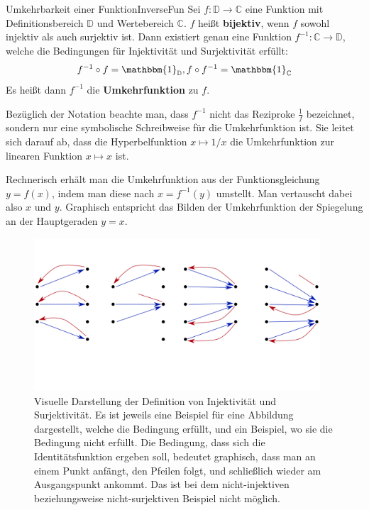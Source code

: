 \begin{statement}{Umkehrbarkeit einer Funktion}{InverseFun}
    Sei $f: \mathbb{D} \to \mathbb{C}$ eine Funktion mit Definitionsbereich $\mathbb{D}$ und Wertebereich $\mathbb{C}$. $f$ heißt \textbf{bijektiv}, wenn $f$ sowohl injektiv als auch surjektiv ist. Dann existiert genau eine Funktion $f^{-1}: \mathbb{C} \to \mathbb{D}$, welche die Bedingungen für Injektivität und Surjektivität erfüllt:
    $$
    f^{-1} \circ f = \mathbbm{1}_\mathbb{D}, f \circ f^{-1} = \mathbbm{1}_\mathbb{C}
    $$
    Es heißt dann $f^{-1}$ die \textbf{Umkehrfunktion} zu $f$.
\end{statement}

Bezüglich der Notation beachte man, dass $f^{-1}$ nicht das Reziproke $\frac{1}{f}$ bezeichnet, sondern nur eine symbolische Schreibweise für die Umkehrfunktion ist. Sie leitet sich darauf ab, dass die Hyperbelfunktion $x \mapsto 1/x$ die Umkehrfunktion zur linearen Funktion $x \mapsto x$ ist.

Rechnerisch erhält man die Umkehrfunktion aus der Funktionsgleichung $y = f(x)$, indem man diese nach $x = f^{-1}(y)$ umstellt. Man vertauscht dabei also $x$ und $y$. Graphisch entspricht das Bilden der Umkehrfunktion der Spiegelung an der Hauptgeraden $y=x$.

\begin{figure}
    \centering
    \includegraphics[width=0.95\textwidth]{./svg/injective-surjective}
    \caption{Visuelle Darstellung der Definition von Injektivität und Surjektivität. Es ist jeweils eine Beispiel für eine Abbildung dargestellt, welche die Bedingung erfüllt, und ein Beispiel, wo sie die Bedingung nicht erfüllt. Die Bedingung, dass sich die Identitätsfunktion ergeben soll, bedeutet graphisch, dass man an einem Punkt anfängt, den Pfeilen folgt, und schließlich wieder am Ausgangspunkt ankommt. Das ist bei dem nicht-injektiven beziehungsweise nicht-surjektiven Beispiel nicht möglich.}
    \label{fig:InjectSurject}
\end{figure}

